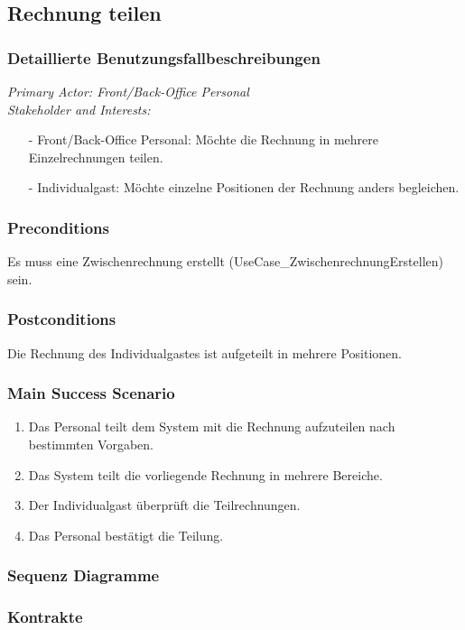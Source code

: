 \documentclass[./detailed_overview_usecases.tex]{subfiles}
\begin{document}
    \subsection{Rechnung teilen}
    \subsubsection{Detaillierte Benutzungsfallbeschreibungen}
    \textit{Primary Actor: Front/Back-Office Personal}
    \\
    \textit{Stakeholder and Interests:}
    \begin{itemize}
        \item[-] Front/Back-Office Personal: Möchte die Rechnung in mehrere Einzelrechnungen teilen.
        \item[-] Individualgast: Möchte einzelne Positionen der Rechnung anders begleichen.
    \end{itemize}

    \subsubsection*{Preconditions}
    Es muss eine Zwischenrechnung erstellt (UseCase_ZwischenrechnungErstellen) sein.

    \subsubsection*{Postconditions}
    Die Rechnung des Individualgastes ist aufgeteilt in mehrere Positionen.

    \subsubsection*{Main Success Scenario}
    \begin{enumerate}
        \item Das Personal teilt dem System mit die Rechnung aufzuteilen nach bestimmten Vorgaben.
        \item Das System teilt die vorliegende Rechnung in mehrere Bereiche.
        \item Der Individualgast überprüft die Teilrechnungen.
        \item Das Personal bestätigt die Teilung.
    \end{enumerate}
    \subsubsection{Sequenz Diagramme}
    \subsubsection{Kontrakte}
\end{document}
